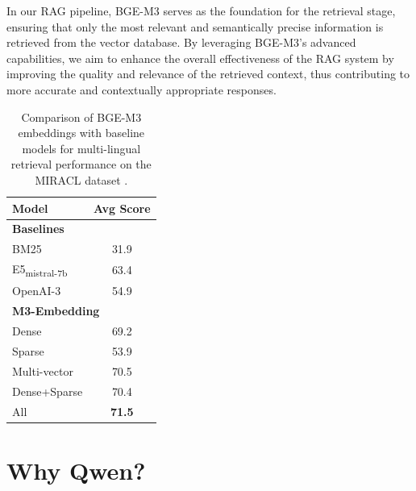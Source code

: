 In our RAG pipeline, BGE-M3 serves as the foundation for the retrieval stage, ensuring that only the most relevant and semantically precise information is retrieved from the vector database. By leveraging BGE-M3’s advanced capabilities, we aim to enhance the overall effectiveness of the RAG system by improving the quality and relevance of the retrieved context, thus contributing to more accurate and contextually appropriate responses.

\begin{table}[h!]
	\centering
	\begin{tabular}{l c}
		\hline
		\textbf{Model}               & \textbf{Avg Score} \\ \hline
		\multicolumn{2}{l}{\textbf{Baselines}} \\ \hline
		BM25 \cite{bm25}                         & 31.9               \\
		E5\textsubscript{mistral-7b} \cite{wang2024e5_improve} & 63.4               \\
		OpenAI-3                     & 54.9               \\ \hline
		\multicolumn{2}{l}{\textbf{M3-Embedding}} \cite{chen2024bge} \\ \hline
		Dense                        & 69.2               \\
		Sparse                       & 53.9               \\
		Multi-vector                 & 70.5               \\
		Dense+Sparse                 & 70.4               \\
		All                          & \textbf{71.5}      \\ \hline
	\end{tabular}
	\caption{Comparison of BGE-M3 embeddings with baseline models for multi-lingual retrieval performance on the MIRACL dataset \cite{chen2024bge}.}
	\label{tab:bge_m3_comparison_filtered}
\end{table}

\section{Why Qwen?}



